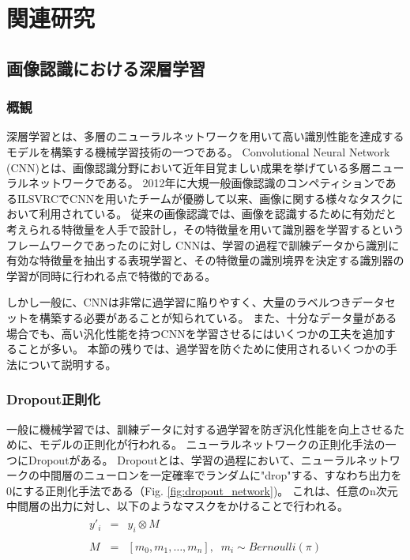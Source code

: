 \chapter{関連研究}

\section{画像認識における深層学習}
\subsection{概観}
深層学習とは、多層のニューラルネットワークを用いて高い識別性能を達成するモデルを構築する機械学習技術の一つである。
Convolutional Neural Network (CNN)とは、画像認識分野において近年目覚ましい成果を挙げている多層ニューラルネットワークである。
2012年に大規一般画像認識のコンペティションであるILSVRCでCNNを用いたチームが優勝して以来、画像に関する様々なタスクにおいて利用されている。
従来の画像認識では、画像を認識するために有効だと考えられる特徴量を人手で設計し，その特徴量を用いて識別器を学習するというフレームワークであったのに対し
CNNは、学習の過程で訓練データから識別に有効な特徴量を抽出する表現学習と、その特徴量の識別境界を決定する識別器の学習が同時に行われる点で特徴的である。

しかし一般に、CNNは非常に過学習に陥りやすく、大量のラベルつきデータセットを構築する必要があることが知られている。
また、十分なデータ量がある場合でも、高い汎化性能を持つCNNを学習させるにはいくつかの工夫を追加することが多い。
本節の残りでは、過学習を防ぐために使用されるいくつかの手法について説明する。

\subsection{Dropout正則化}
一般に機械学習では、訓練データに対する過学習を防ぎ汎化性能を向上させるために、モデルの正則化が行われる。
ニューラルネットワークの正則化手法の一つにDropout\cite{hinton2012improving, srivastava2014dropout}がある。
Dropoutとは、学習の過程において、ニューラルネットワークの中間層のニューロンを一定確率でランダムに"drop"する、すなわち出力を0にする正則化手法である（Fig. \ref{fig:dropout_network})。
これは、任意のn次元中間層の出力に対し、以下のようなマスクをかけることで行われる。
\begin{eqnarray}
    \begin{split}
        y'_i &=& y_i \otimes M \\
        \\
        M &=& [m_0, m_1, \dots, m_n],\;\; m_i \sim Bernoulli(\pi) 
    \end{split}
\end{eqnarray}

